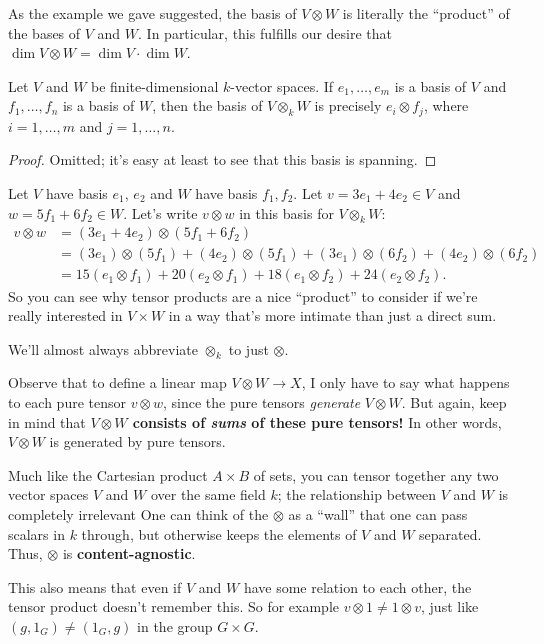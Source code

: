 As the example we gave suggested,
the basis of $V \otimes W$ is literally the ``product''
of the bases of $V$ and $W$.
In particular, this fulfills our desire that $\dim V \otimes W
= \dim V \cdot \dim W$.
\begin{proposition}
	Let $V$ and $W$ be finite-dimensional $k$-vector spaces.
	If $e_1, \dots, e_m$ is a basis of $V$ and $f_1, \dots, f_n$ is a basis of $W$,
	then the basis of $V \otimes_k W$
	is precisely $e_i \otimes f_j$, where $i=1,\dots,m$ and $j=1,\dots,n$.
\end{proposition}
\begin{proof}
	Omitted; it's easy at least to see that this basis is spanning.
\end{proof}

\begin{example}
	Let $V$ have basis $e_1$, $e_2$ and $W$ have basis $f_1, f_2$.
	Let $v = 3e_1 + 4e_2 \in V$ and $w = 5f_1 + 6f_2 \in W$.
	Let's write $v \otimes w$ in this basis for $V \otimes_k W$:
	\begin{align*}
		v \otimes w &= (3e_1+4e_2) \otimes (5f_1+6f_2) \\
		&= (3e_1) \otimes (5f_1) +  (4e_2) \otimes (5f_1)
		+ (3e_1) \otimes (6f_2) + (4e_2) \otimes (6f_2) \\
		&= 15 (e_1 \otimes f_1) + 20(e_2 \otimes f_1)
		+ 18 (e_1 \otimes f_2) + 24(e_2 \otimes f_2).
	\end{align*}
	So you can see why tensor products are a nice ``product'' to
	consider if we're really interested in $V \times W$
	in a way that's more intimate than just a direct sum.
\end{example}

\begin{abuse}
	We'll almost always abbreviate $\otimes_k$ to just $\otimes$.
\end{abuse}
\begin{remark}
	Observe that to define a linear map $V \otimes W \to X$,
	I only have to say what happens to each pure tensor $v \otimes w$,
	since the pure tensors \emph{generate} $V \otimes W$.
	But again, keep in mind that 
	\textbf{$V \otimes W$ consists of \emph{sums} of these pure tensors!}
	In other words, $V \otimes W$ is generated by pure tensors.
\end{remark}

\begin{remark}
	Much like the Cartesian product $A \times B$ of sets,
	you can tensor together any two vector spaces $V$ and $W$ over the same field $k$;
	the relationship between $V$ and $W$ is completely irrelevant
	One can think of the $\otimes$ as a ``wall'' that one can pass
	scalars in $k$ through, but otherwise keeps the elements of $V$ and $W$ separated.
	Thus, $\otimes$ is \textbf{content-agnostic}.

	This also means that even if $V$ and $W$ have some relation to each other,
	the tensor product doesn't remember this.
	So for example $v \otimes 1 \neq 1 \otimes v$,
	just like $(g,1_G) \neq (1_G,g)$ in the group $G \times G$.
\end{remark}

